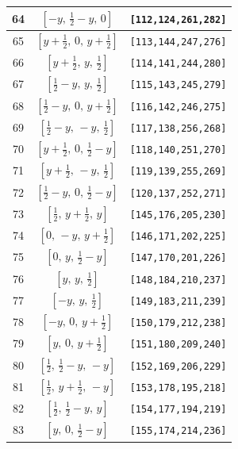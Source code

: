 \documentclass[fleqn,8pt]{jsarticle}
\begin{document}
\begin{longtable}{ccc}
64 & $\left[ - y,\, \frac{1}{2} - y,\, 0 \right]$ & {\tt [112,124,261,282]} \\ \hline
65 & $\left[ y + \frac{1}{2},\, 0,\, y + \frac{1}{2} \right]$ & {\tt [113,144,247,276]} \\ \hline
66 & $\left[ y + \frac{1}{2},\, y,\, \frac{1}{2} \right]$ & {\tt [114,141,244,280]} \\ \hline
67 & $\left[ \frac{1}{2} - y,\, y,\, \frac{1}{2} \right]$ & {\tt [115,143,245,279]} \\ \hline
68 & $\left[ \frac{1}{2} - y,\, 0,\, y + \frac{1}{2} \right]$ & {\tt [116,142,246,275]} \\ \hline
69 & $\left[ \frac{1}{2} - y,\, - y,\, \frac{1}{2} \right]$ & {\tt [117,138,256,268]} \\ \hline
70 & $\left[ y + \frac{1}{2},\, 0,\, \frac{1}{2} - y \right]$ & {\tt [118,140,251,270]} \\ \hline
71 & $\left[ y + \frac{1}{2},\, - y,\, \frac{1}{2} \right]$ & {\tt [119,139,255,269]} \\ \hline
72 & $\left[ \frac{1}{2} - y,\, 0,\, \frac{1}{2} - y \right]$ & {\tt [120,137,252,271]} \\ \hline
73 & $\left[ \frac{1}{2},\, y + \frac{1}{2},\, y \right]$ & {\tt [145,176,205,230]} \\ \hline
74 & $\left[ 0,\, - y,\, y + \frac{1}{2} \right]$ & {\tt [146,171,202,225]} \\ \hline
75 & $\left[ 0,\, y,\, \frac{1}{2} - y \right]$ & {\tt [147,170,201,226]} \\ \hline
76 & $\left[ y,\, y,\, \frac{1}{2} \right]$ & {\tt [148,184,210,237]} \\ \hline
77 & $\left[ - y,\, y,\, \frac{1}{2} \right]$ & {\tt [149,183,211,239]} \\ \hline
78 & $\left[ - y,\, 0,\, y + \frac{1}{2} \right]$ & {\tt [150,179,212,238]} \\ \hline
79 & $\left[ y,\, 0,\, y + \frac{1}{2} \right]$ & {\tt [151,180,209,240]} \\ \hline
80 & $\left[ \frac{1}{2},\, \frac{1}{2} - y,\, - y \right]$ & {\tt [152,169,206,229]} \\ \hline
81 & $\left[ \frac{1}{2},\, y + \frac{1}{2},\, - y \right]$ & {\tt [153,178,195,218]} \\ \hline
82 & $\left[ \frac{1}{2},\, \frac{1}{2} - y,\, y \right]$ & {\tt [154,177,194,219]} \\ \hline
83 & $\left[ y,\, 0,\, \frac{1}{2} - y \right]$ & {\tt [155,174,214,236]} \\ \hline

\end{longtable}
\end{document}
